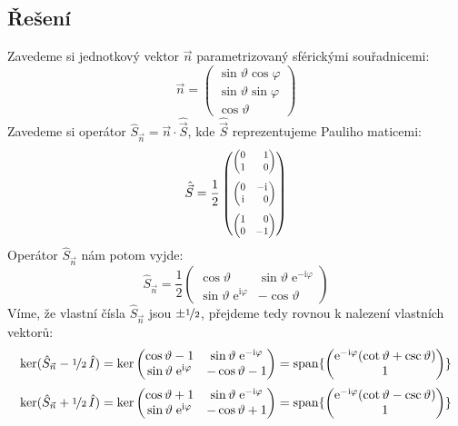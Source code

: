 \documentclass[10pt,a4paper]{article}
\def\ph{\phantom}
\newcommand{\const}[1]{\text{#1}}
\newcommand{\mat}[1]{
    \begin{pmatrix}
        #1
    \end{pmatrix}
}
\newcommand{\smat}[2][1]{
    \scalebox{#1}{$\mat{#2}$}
}
\newcommand{\e}[1]{\const{e}^{#1}}
\renewcommand{\i}{\const{i}}
\newcommand{\vechat}[1]{\hat{\vec{#1}}}
\begin{document}
\subsection{Řešení}
Zavedeme si jednotkový vektor $\vec n$ parametrizovaný sférickými souřadnicemi:
\begin{equation*}
    \vec n = \mat{
        \sin \vartheta \cos \varphi \\
        \sin \vartheta \sin \varphi \\
        \cos \vartheta
    }
\end{equation*}
Zavedeme si operátor $\hat S_{\vec n} = \vec n \cdot \vechat S$, kde $\vechat S$ reprezentujeme Pauliho maticemi:
\begin{equation*}
    \vechat S = \frac{1}{2} \mat{
        \smat[0.8]{0 & \ph{-} 1 \\ 1 & \ph{-} 0} \\[10pt]
        \smat[0.8]{0 & -\i \\ \i & \ph{-} 0} \\[10pt]
        \smat[0.8]{1 & \ph{-} 0 \\ 0 & -1}
    }
\end{equation*}
Operátor $\hat S_{\vec n}$ nám potom vyjde:
\begin{equation*}
    \hat S_{\vec n} = \frac{1}{2} \mat{
        \cos \vartheta & \sin \vartheta \; \e{-\i \varphi} \\
        \sin \vartheta \; \e{\i \varphi} & -\cos \vartheta
    }
\end{equation*}
Víme, že vlastní čísla $\hat S_{\vec n}$ jsou $\pm \nicefrac{1}{2}$, přejdeme tedy rovnou k nalezení vlastních vektorů:
\begin{equation*}
    \ker(\hat S_{\vec n} - \nicefrac{1}{2} \, \hat I)
    = \ker\mat{
        \cos \vartheta - 1 & \sin \vartheta \; \e{-\i \varphi} \\
        \sin \vartheta \; \e{\i \varphi} & -\cos \vartheta - 1
    }
    = \operatorname{span} \{ \mat{
        \e{-\i \varphi} (\cot \vartheta + \csc \vartheta) \\ 1
    } \}
\end{equation*}
\begin{equation*}
    \ker(\hat S_{\vec n} + \nicefrac{1}{2} \, \hat I)
    = \ker\mat{
        \cos \vartheta + 1 & \sin \vartheta \; \e{-\i \varphi} \\
        \sin \vartheta \; \e{\i \varphi} & -\cos \vartheta + 1
    }
    = \operatorname{span} \{ \mat{
        \e{-\i \varphi} (\cot \vartheta - \csc \vartheta) \\ 1
    } \}
\end{equation*}
\end{document}
